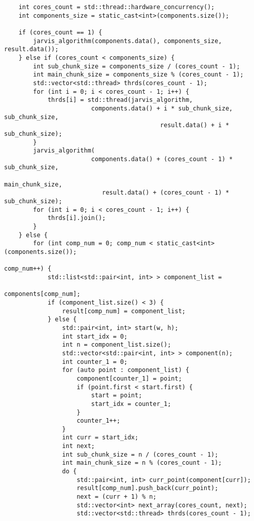 \documentclass{report}
\begin{document}
\begin{lstlisting}
    int cores_count = std::thread::hardware_concurrency();
    int components_size = static_cast<int>(components.size());

    if (cores_count == 1) {
        jarvis_algorithm(components.data(), components_size, result.data());
    } else if (cores_count < components_size) {
        int sub_chunk_size = components_size / (cores_count - 1);
        int main_chunk_size = components_size % (cores_count - 1);
        std::vector<std::thread> thrds(cores_count - 1);
        for (int i = 0; i < cores_count - 1; i++) {
            thrds[i] = std::thread(jarvis_algorithm,
                        components.data() + i * sub_chunk_size, sub_chunk_size,
                                           result.data() + i * sub_chunk_size);
        }
        jarvis_algorithm(
                        components.data() + (cores_count - 1) * sub_chunk_size,
                                                               main_chunk_size,
                           result.data() + (cores_count - 1) * sub_chunk_size);
        for (int i = 0; i < cores_count - 1; i++) {
            thrds[i].join();
        }
    } else {
        for (int comp_num = 0; comp_num < static_cast<int>(components.size());
                                                                  comp_num++) {
            std::list<std::pair<int, int> > component_list =
                                                          components[comp_num];
            if (component_list.size() < 3) {
                result[comp_num] = component_list;
            } else {
                std::pair<int, int> start(w, h);
                int start_idx = 0;
                int n = component_list.size();
                std::vector<std::pair<int, int> > component(n);
                int counter_1 = 0;
                for (auto point : component_list) {
                    component[counter_1] = point;
                    if (point.first < start.first) {
                        start = point;
                        start_idx = counter_1;
                    }
                    counter_1++;
                }
                int curr = start_idx;
                int next;
                int sub_chunk_size = n / (cores_count - 1);
                int main_chunk_size = n % (cores_count - 1);
                do {
                    std::pair<int, int> curr_point(component[curr]);
                    result[comp_num].push_back(curr_point);
                    next = (curr + 1) % n;
                    std::vector<int> next_array(cores_count, next);
                    std::vector<std::thread> thrds(cores_count - 1);

\end{lstlisting}
\end{document}
